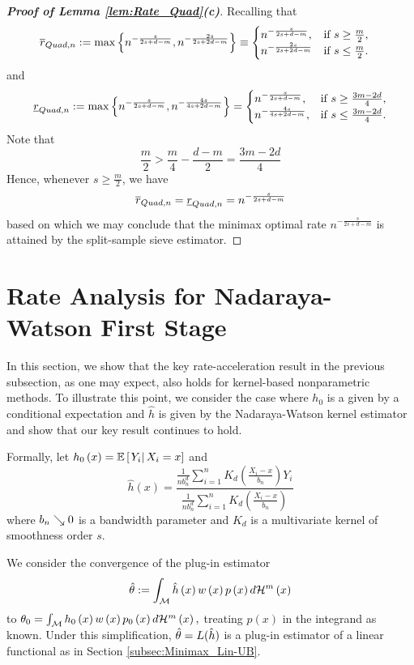 \documentclass[12pt,american]{article}
\theoremstyle{definition}
\theoremstyle{plain}
\theoremstyle{definition}
\theoremstyle{plain}
\theoremstyle{plain}
\theoremstyle{plain}
\theoremstyle{plain}
\theoremstyle{plain}
\newcommand{\E}{\mathbb{E}}
\begin{document}
\begin{proof}[\textbf{Proof of Lemma \ref{lem:Rate_Quad}(c)}]
Recalling that
\begin{align*}
\overline{r}_{Quad,n} & :=\max\left\{ n^{-\frac{s}{2s+d-m}},n^{-\frac{2s}{2s+2d-m}}\right\} \equiv\begin{cases}
n^{-\frac{s}{2s+d-m}}, & \text{if }s\geq\frac{m}{2},\\
n^{-\frac{2s}{2s+2d-m}} & \text{if }s\leq\frac{m}{2}.
\end{cases}
\end{align*}
and
\[
\underline{r}_{Quad,n}:=\max\left\{ n^{-\frac{s}{2s+d-m}},n^{-\frac{4s}{4s+2d-m}}\right\} =\begin{cases}
n^{-\frac{s}{2s+d-m}}, & \text{if }s\geq\frac{3m-2d}{4},\\
n^{-\frac{4s}{4s+2d-m}}, & \text{if }s\leq\frac{3m-2d}{4}.
\end{cases}
\]
Note that
\[
\frac{m}{2}>\frac{m}{4}-\frac{d-m}{2}=\frac{3m-2d}{4}
\]
Hence, whenever $s\geq\frac{m}{2}$, we have
\[
\overline{r}_{Quad,n}=\underline{r}_{Quad,n}=n^{-\frac{s}{2s+d-m}}
\]
based on which we may conclude that the minimax optimal rate $n^{-\frac{s}{2s+d-m}}$
is attained by the split-sample sieve estimator.
\end{proof}

\section{Rate Analysis for Nadaraya-Watson First Stage}\label{subsec:Kernel}

In this section, we show that the key rate-acceleration result
in the previous subsection, as one may expect, also holds for kernel-based
nonparametric methods. To illustrate this point, we consider the case
where $h_{0}$ is a given by a conditional expectation and $\hat{h}$
is given by the Nadaraya-Watson kernel estimator and show that
our key result continues to hold.

Formally, let $h_{0}\left(x\right)=\E\left[\rest{Y_{i}}X_{i}=x\right]$
and
\[
\hat{h}\left(x\right)=\frac{\frac{1}{nb_{n}^{d}}\sum_{i=1}^{n}K_{d}\left(\frac{X_{i}-x}{b_{n}}\right)Y_{i}}{\frac{1}{nb_{n}^{d}}\sum_{i=1}^{n}K_{d}\left(\frac{X_{i}-x}{b_{n}}\right)}
\]
where $b_{n}\searrow0$ is a bandwidth parameter and $K_{d}$ is a
multivariate kernel of smoothness order $s$.

We consider the convergence of the plug-in estimator $$\hat{\theta}:=\int_{{\cal M}}\hat{h}\left(x\right)w\left(x\right)p\left(x\right)d{\cal H}^{m}\left(x\right)$$ to $\theta_{0}=\int_{{\cal M}}h_{0}\left(x\right)w\left(x\right)p_{0}\left(x\right)d{\cal H}^{m}\left(x\right),$ treating $p(x)$ in the integrand as known. Under this simplification, $\hat{\theta} = L(\hat{h})$ is a plug-in estimator of a linear functional as in Section \ref{subsec:Minimax_Lin-UB}.
\end{document}
